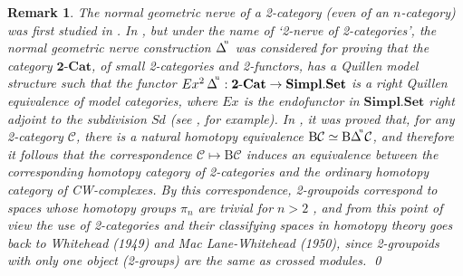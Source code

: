 \documentclass[]{amsart}
\newtheorem{remark}[theorem]{Remark}
\begin{document}
\begin{remark}{\em
The normal geometric nerve of a 2-category (even of an $n$-category) was first studied in
\cite{street2}.  In \cite{tonks}, but under the name of `2-nerve of 2-categories', the normal
geometric nerve construction $\Delta^{\hspace{-2pt}^\mathrm{u}}$ was considered for proving that
the category $\mathbf{2}\text{-}{\ensuremath{\mathbf{Cat}}}$, of small 2-categories and 2-functors, has a Quillen model
structure such that the functor $Ex^2\,\Delta^{\hspace{-2pt}^\mathrm{u}}:\mathbf{2}\text{-}{\ensuremath{\mathbf{Cat}}}\to
{\ensuremath{\mathbf{Simpl.Set}}}$ is a right Quillen equivalence of model categories, where $Ex$ is the endofunctor in ${\ensuremath{\mathbf{Simpl.Set}}}$
right adjoint to the subdivision $Sd$ (see \cite{g-j}, for example). In \cite{b-c},  it was proved
that, for any 2-category ${\ensuremath{\mathcal{C}}}$, there is a natural homotopy equivalence ${\ensuremath{\mathrm{B}}}{\ensuremath{\mathcal{C}}}\simeq
{\ensuremath{\mathrm{B}}}\Delta^{\hspace{-2pt}^\mathrm{u}}{\ensuremath{\mathcal{C}}}$, and therefore it follows that the correspondence
${\ensuremath{\mathcal{C}}}\mapsto{\ensuremath{\mathrm{B}}}{\ensuremath{\mathcal{C}}}$  induces an equivalence between the corresponding homotopy category of
2-categories and the ordinary homotopy category of CW-complexes. By this correspondence,
2-groupoids correspond to spaces whose homotopy groups $\pi_n$ are trivial for $n > 2$
\cite{moerdijk-svensson}, and from this point of view the use of 2-categories and their classifying
spaces in homotopy theory goes back to Whitehead (1949) and Mac Lane-Whitehead (1950), since
2-groupoids with only one object (2-groups) are the same as crossed modules. }\qed
\end{remark}
\end{document}
